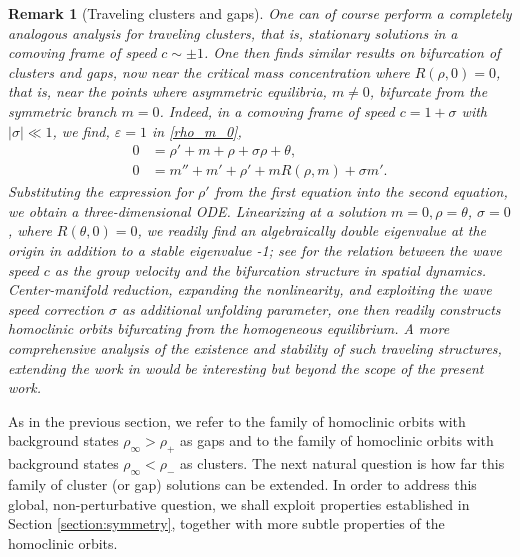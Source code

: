 \documentclass[10pt]{article}
\newtheorem{Remark}[Lemma]{Remark}
\begin{document}
\begin{Remark}[Traveling clusters and gaps]
 One can of course perform a completely analogous analysis for traveling clusters, that is, stationary solutions in a comoving frame of speed $c\sim\pm1$. One then finds similar results on bifurcation of clusters and gaps, now near the critical mass concentration where $R(\rho,0)=0$, that is, near the points where asymmetric equilibria, $m\neq 0$,  bifurcate from the symmetric branch $m=0$. Indeed, in a comoving frame of speed $c=1+\sigma$ with $|\sigma|\ll 1$, we find, $\varepsilon=1$ in \eqref{rho_m_0}, 
 \begin{equation}
\begin{aligned}
0&= \rho' + m + \rho +\sigma \rho +\theta,\\
0 &=  m'' + m' + \rho' +mR(\rho,m)+\sigma m'.
\end{aligned}
\label{rho_m_01}
\end{equation}
 Substituting the expression for $\rho'$ from the first equation into the second equation, we obtain a three-dimensional ODE. Linearizing at a solution $m=0,\rho=\theta$, $\sigma=0$, where $R(\theta,0)=0$, we readily find an algebraically double eigenvalue at the origin in addition to a stable eigenvalue -1; see \cite{fs,ssmorse} for the relation between the wave speed $c$ as the group velocity and the bifurcation structure in spatial dynamics. Center-manifold reduction, expanding the nonlinearity, and exploiting the wave speed correction $\sigma$ as additional unfolding parameter, one then readily constructs homoclinic orbits bifurcating from the homogeneous equilibrium. A more comprehensive analysis of the existence and stability of such traveling structures, extending the work in \cite{fuhrmann} would be interesting but beyond the scope of the present work. 
\end{Remark}

As in the previous section, we refer to the family of homoclinic orbits with background states $\rho_\infty>\rho_+$ as gaps and to the family of homoclinic orbits with background states $\rho_\infty<\rho_-$ as clusters. The next natural question is how far this family of cluster (or gap) solutions can be extended. 
In order to address this global, non-perturbative question, we shall exploit properties established in  Section \ref{section:symmetry}, together with more subtle properties of the homoclinic orbits. 
\end{document}
